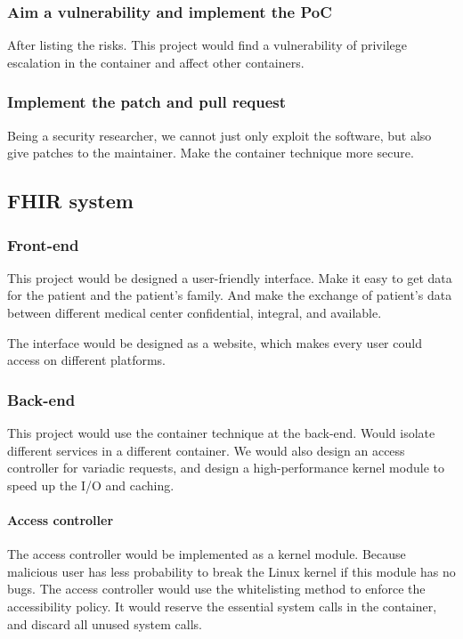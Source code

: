 \documentclass[12pt,a4paper]{article}
\begin{document}
\subsubsection{Aim a vulnerability and implement the PoC}
After listing the risks. This project would find a vulnerability of privilege escalation in
the container and affect other containers.

\subsubsection{Implement the patch and pull request}
Being a security researcher, we cannot just only exploit the software, but also give patches to
the maintainer. Make the container technique more secure.

\subsection{FHIR system}
\subsubsection{Front-end}
This project would be designed a user-friendly interface. Make it easy to get data for the
patient and the patient's family. And make the exchange of patient's data between different
medical center confidential, integral, and available.

The interface would be designed as a website, which makes every user could access on different
platforms.

\subsubsection{Back-end}
This project would use the container technique at the back-end. Would isolate different services in
a different container. We would also design an access controller for variadic requests, and
design a high-performance kernel module to speed up the I/O and caching.

\paragraph{Access controller}
The access controller would be implemented as a kernel module. Because malicious user has less
probability to break the Linux kernel if this module has no bugs.
The access controller would use the whitelisting method to enforce the accessibility policy.
It would reserve the essential system calls in the container, and discard all unused system calls.
\end{document}
